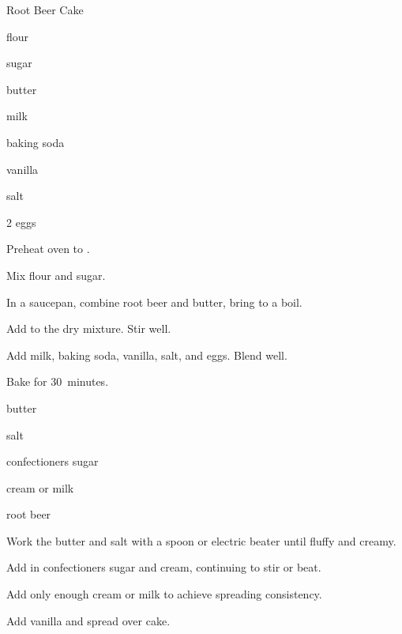 \begin{recipe}{ Root Beer Cake }{}{}

\begin{ingredients}
\item {} flour
\item {} sugar
\item {} 
\item {} butter
\item \C{\half} milk
\item {} baking soda
\item {} vanilla
\item \tp{\half} salt
\item 2 eggs
\end{ingredients}

\begin{directions}
\item Preheat oven to .
\item Mix flour and sugar.
\item In a saucepan, combine root beer and butter, bring to a boil.
\item Add to the dry mixture.  Stir well.
\item Add milk, baking soda, vanilla, salt, and eggs. Blend well.
\item Bake for 30~minutes. 
\end{directions}


\begin{ingredients}
\item \C{\quarter} butter
\item \tp{\eighth} salt
\item {} confectioners sugar
\item {} cream or milk
\item {} root beer
\end{ingredients}

\begin{directions}
\item Work the butter and salt with a spoon or electric beater until fluffy and creamy.
\item Add in confectioners sugar and cream, continuing to stir or beat.
\item Add only enough cream or milk to achieve spreading consistency.
\item Add vanilla and spread over cake.
\end{directions}
\end{recipe}
